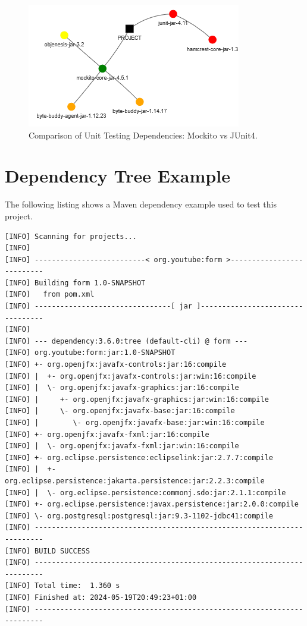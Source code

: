 \documentclass[conference]{IEEEtran}
\begin{document}
\begin{figure}[H]
    \centering
    \includegraphics[width=1\linewidth]{Comparison.png}
    \caption{Comparison of Unit Testing Dependencies: Mockito vs JUnit4.} 
    \label{fig:comp}
\end{figure}

\newpage

\section{Dependency Tree Example}
The following listing shows a Maven dependency example used to test this project. 

\begin{lstlisting}[caption=Example Maven dependencies]
[INFO] Scanning for projects...
[INFO] 
[INFO] --------------------------< org.youtube:form >--------------------------
[INFO] Building form 1.0-SNAPSHOT
[INFO]   from pom.xml
[INFO] --------------------------------[ jar ]---------------------------------
[INFO] 
[INFO] --- dependency:3.6.0:tree (default-cli) @ form ---
[INFO] org.youtube:form:jar:1.0-SNAPSHOT
[INFO] +- org.openjfx:javafx-controls:jar:16:compile
[INFO] |  +- org.openjfx:javafx-controls:jar:win:16:compile
[INFO] |  \- org.openjfx:javafx-graphics:jar:16:compile
[INFO] |     +- org.openjfx:javafx-graphics:jar:win:16:compile
[INFO] |     \- org.openjfx:javafx-base:jar:16:compile
[INFO] |        \- org.openjfx:javafx-base:jar:win:16:compile
[INFO] +- org.openjfx:javafx-fxml:jar:16:compile
[INFO] |  \- org.openjfx:javafx-fxml:jar:win:16:compile
[INFO] +- org.eclipse.persistence:eclipselink:jar:2.7.7:compile
[INFO] |  +- org.eclipse.persistence:jakarta.persistence:jar:2.2.3:compile
[INFO] |  \- org.eclipse.persistence:commonj.sdo:jar:2.1.1:compile
[INFO] +- org.eclipse.persistence:javax.persistence:jar:2.0.0:compile
[INFO] \- org.postgresql:postgresql:jar:9.3-1102-jdbc41:compile
[INFO] ------------------------------------------------------------------------
[INFO] BUILD SUCCESS
[INFO] ------------------------------------------------------------------------
[INFO] Total time:  1.360 s
[INFO] Finished at: 2024-05-19T20:49:23+01:00
[INFO] ------------------------------------------------------------------------


\end{lstlisting}


\ifCLASSOPTIONcaptionsoff
  \newpage
\fi
\end{document}
